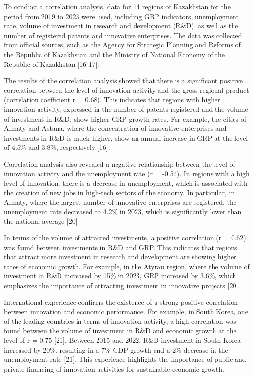 To conduct a correlation analysis, data for 14 regions of Kazakhstan for
the period from 2019 to 2023 were used, including GRP indicators,
unemployment rate, volume of investment in research and development
(R\&D), as well as the number of registered patents and innovative
enterprises. The data was collected from official sources, such as the
Agency for Strategic Planning and Reforms of the Republic of Kazakhstan
and the Ministry of National Economy of the Republic of Kazakhstan
{[}16-17{]}.

The results of the correlation analysis showed that there is a
significant positive correlation between the level of innovation
activity and the gross regional product (correlation coefficient r =
0.68). This indicates that regions with higher innovation activity,
expressed in the number of patents registered and the volume of
investment in R\&D, show higher GRP growth rates. For example, the
cities of Almaty and Astana, where the concentration of innovative
enterprises and investments in R\&D is much higher, show an annual
increase in GRP at the level of 4.5\% and 3.8\%, respectively {[}16{]}.

Correlation analysis also revealed a negative relationship between the
level of innovation activity and the unemployment rate (r = -0.54). In
regions with a high level of innovation, there is a decrease in
unemployment, which is associated with the creation of new jobs in
high-tech sectors of the economy. In particular, in Almaty, where the
largest number of innovative enterprises are registered, the
unemployment rate decreased to 4.2\% in 2023, which is significantly
lower than the national average {[}20{]}.

In terms of the volume of attracted investments, a positive correlation
(r = 0.62) was found between investments in R\&D and GRP. This indicates
that regions that attract more investment in research and development
are showing higher rates of economic growth. For example, in the Atyrau
region, where the volume of investment in R\&D increased by 15\% in
2023, GRP increased by 3.6\%, which emphasizes the importance of
attracting investment in innovative projects {[}20{]}.

International experience confirms the existence of a strong positive
correlation between innovation and economic performance. For example, in
South Korea, one of the leading countries in terms of innovation
activity, a high correlation was found between the volume of investment
in R\&D and economic growth at the level of r = 0.75 {[}21{]}. Between
2015 and 2022, R\&D investment in South Korea increased by 20\%,
resulting in a 7\% GDP growth and a 2\% decrease in the unemployment
rate {[}21{]}. This experience highlights the importance of public and
private financing of innovation activities for sustainable economic
growth.

